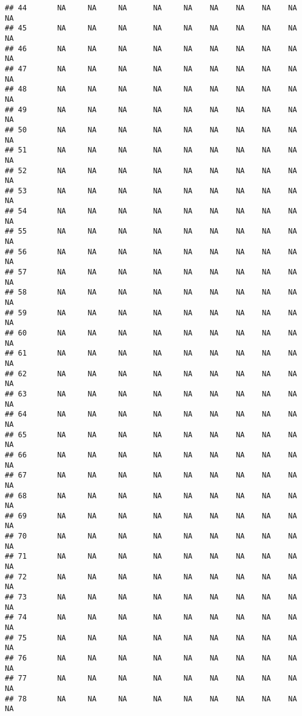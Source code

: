 \documentclass{article}\usepackage{graphicx, color}
\makeatletter
\newenvironment{kframe}{%
 \def\at@end@of@kframe{}%
 \ifinner\ifhmode%
  \def\at@end@of@kframe{\end{minipage}}%
  \begin{minipage}{\columnwidth}%
 \fi\fi%
 \def\FrameCommand##1{\hskip\@totalleftmargin \hskip-\fboxsep
 \colorbox{shadecolor}{##1}\hskip-\fboxsep
     \hskip-\linewidth \hskip-\@totalleftmargin \hskip\columnwidth}%
 \MakeFramed {\advance\hsize-\width
   \@totalleftmargin\z@ \linewidth\hsize
   \@setminipage}}%
 {\par\unskip\endMakeFramed%
 \at@end@of@kframe}
\newenvironment{knitrout}{}{} %
\makeatother
\begin{document}
\begin{knitrout}
\begin{kframe}
\begin{verbatim}
## 44       NA     NA     NA      NA     NA    NA    NA    NA    NA     NA
## 45       NA     NA     NA      NA     NA    NA    NA    NA    NA     NA
## 46       NA     NA     NA      NA     NA    NA    NA    NA    NA     NA
## 47       NA     NA     NA      NA     NA    NA    NA    NA    NA     NA
## 48       NA     NA     NA      NA     NA    NA    NA    NA    NA     NA
## 49       NA     NA     NA      NA     NA    NA    NA    NA    NA     NA
## 50       NA     NA     NA      NA     NA    NA    NA    NA    NA     NA
## 51       NA     NA     NA      NA     NA    NA    NA    NA    NA     NA
## 52       NA     NA     NA      NA     NA    NA    NA    NA    NA     NA
## 53       NA     NA     NA      NA     NA    NA    NA    NA    NA     NA
## 54       NA     NA     NA      NA     NA    NA    NA    NA    NA     NA
## 55       NA     NA     NA      NA     NA    NA    NA    NA    NA     NA
## 56       NA     NA     NA      NA     NA    NA    NA    NA    NA     NA
## 57       NA     NA     NA      NA     NA    NA    NA    NA    NA     NA
## 58       NA     NA     NA      NA     NA    NA    NA    NA    NA     NA
## 59       NA     NA     NA      NA     NA    NA    NA    NA    NA     NA
## 60       NA     NA     NA      NA     NA    NA    NA    NA    NA     NA
## 61       NA     NA     NA      NA     NA    NA    NA    NA    NA     NA
## 62       NA     NA     NA      NA     NA    NA    NA    NA    NA     NA
## 63       NA     NA     NA      NA     NA    NA    NA    NA    NA     NA
## 64       NA     NA     NA      NA     NA    NA    NA    NA    NA     NA
## 65       NA     NA     NA      NA     NA    NA    NA    NA    NA     NA
## 66       NA     NA     NA      NA     NA    NA    NA    NA    NA     NA
## 67       NA     NA     NA      NA     NA    NA    NA    NA    NA     NA
## 68       NA     NA     NA      NA     NA    NA    NA    NA    NA     NA
## 69       NA     NA     NA      NA     NA    NA    NA    NA    NA     NA
## 70       NA     NA     NA      NA     NA    NA    NA    NA    NA     NA
## 71       NA     NA     NA      NA     NA    NA    NA    NA    NA     NA
## 72       NA     NA     NA      NA     NA    NA    NA    NA    NA     NA
## 73       NA     NA     NA      NA     NA    NA    NA    NA    NA     NA
## 74       NA     NA     NA      NA     NA    NA    NA    NA    NA     NA
## 75       NA     NA     NA      NA     NA    NA    NA    NA    NA     NA
## 76       NA     NA     NA      NA     NA    NA    NA    NA    NA     NA
## 77       NA     NA     NA      NA     NA    NA    NA    NA    NA     NA
## 78       NA     NA     NA      NA     NA    NA    NA    NA    NA     NA

\end{verbatim}
\end{kframe}
\end{knitrout}
\end{document}
